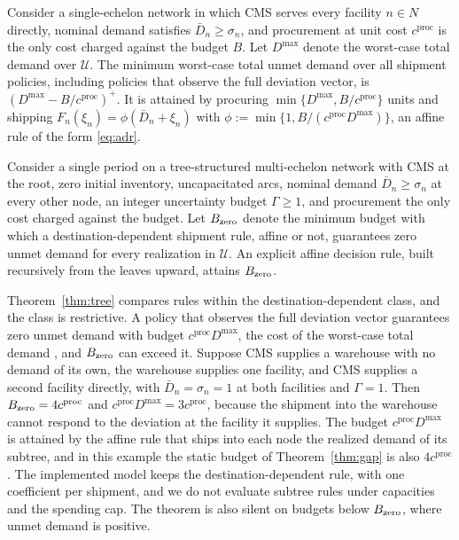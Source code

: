 \documentclass[11pt]{article}
\begin{document}
\begin{proposition}
\label{thm:single}
Consider a single-echelon network in which CMS serves every facility $n \in N$ directly, nominal demand satisfies $\bar D_n \ge \sigma_n$, and procurement at unit cost $c^{\text{proc}}$ is the only cost charged against the budget $B$.
Let $D^{\max}$ denote the worst-case total demand over $\mathcal U$.
The minimum worst-case total unmet demand over all shipment policies, including policies that observe the full deviation vector, is $(D^{\max} - B/c^{\text{proc}})^+$.
It is attained by procuring $\min\{D^{\max}, B/c^{\text{proc}}\}$ units and shipping $F_n(\xi_n) = \phi(\bar D_n + \xi_n)$ with $\phi := \min\{1, B/(c^{\text{proc}}D^{\max})\}$, an affine rule of the form \eqref{eq:adr}.
\end{proposition}

\begin{theorem}
\label{thm:tree}
Consider a single period on a tree-structured multi-echelon network with CMS at the root, zero initial inventory, uncapacitated arcs, nominal demand $\bar D_n \ge \sigma_n$ at every other node, an integer uncertainty budget $\Gamma \ge 1$, and procurement the only cost charged against the budget.
Let $B_{\rm zero}$ denote the minimum budget with which a destination-dependent shipment rule, affine or not, guarantees zero unmet demand for every realization in $\mathcal U$.
An explicit affine decision rule, built recursively from the leaves upward, attains $B_{\rm zero}$.
\end{theorem}

\begin{remark}
\label{rem:destination}
Theorem~\ref{thm:tree} compares rules within the destination-dependent class, and the class is restrictive.
A policy that observes the full deviation vector guarantees zero unmet demand with budget $c^{\text{proc}} D^{\max}$, the cost of the worst-case total demand \citep[Theorem~1]{atamturk07}, and $B_{\rm zero}$ can exceed it.
Suppose CMS supplies a warehouse with no demand of its own, the warehouse supplies one facility, and CMS supplies a second facility directly, with $\bar D_n = \sigma_n = 1$ at both facilities and $\Gamma = 1$.
Then $B_{\rm zero} = 4c^{\text{proc}}$ and $c^{\text{proc}} D^{\max} = 3c^{\text{proc}}$, because the shipment into the warehouse cannot respond to the deviation at the facility it supplies.
The budget $c^{\text{proc}} D^{\max}$ is attained by the affine rule that ships into each node the realized demand of its subtree, and in this example the static budget of Theorem~\ref{thm:gap} is also $4c^{\text{proc}}$.
The implemented model keeps the destination-dependent rule, with one coefficient per shipment, and we do not evaluate subtree rules under capacities and the spending cap.
The theorem is also silent on budgets below $B_{\rm zero}$, where unmet demand is positive.
\end{remark}
\end{document}
